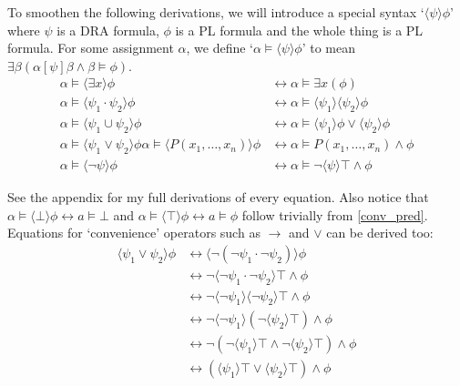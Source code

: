 \documentclass[12pt]{article}
\begin{document}
To smoothen the following derivations, we will introduce a special syntax `$\langle\psi\rangle\phi$' where $\psi$ is a DRA formula, $\phi$ is a PL formula and the whole thing is a PL formula. For some assignment $\alpha$, we define `$\alpha\models\langle\psi\rangle\phi$' to mean $\exists\beta(\alpha[\psi]\beta \wedge \beta\models\phi)$.
%
\begin{align}
\alpha\models\langle\exists x\rangle\phi
 & \leftrightarrow \alpha\models\exists x (\phi) \label{conv_exists}\\
\alpha\models\langle\psi_1\cdot\psi_2\rangle\phi
 & \leftrightarrow \alpha\models\langle\psi_1\rangle\langle\psi_2\rangle\phi \label{conv_and}\\
\alpha\models\langle\psi_1 \cup \psi_2\rangle\phi
 & \leftrightarrow \alpha\models\langle\psi_1\rangle\phi \vee \langle\psi_2\rangle\phi \label{conv_or}\\
 \alpha\models\langle\psi_1 \vee \psi_2\rangle\phi
\alpha\models\langle P(x_1,\dots,x_n)\rangle\phi
 & \leftrightarrow \alpha\models P(x_1,\dots,x_n) \wedge \phi \label{conv_pred}\\
\alpha\models\langle\neg\psi\rangle\phi
 & \leftrightarrow \alpha\models \neg\langle\psi\rangle\top \wedge \phi \label{conv_neg}
\end{align}

See the appendix for my full derivations of every equation. Also notice that $\alpha\models\langle\bot\rangle\phi\leftrightarrow a\models\bot$ and $\alpha\models\langle\top\rangle\phi\leftrightarrow a\models\phi$ follow trivially from \eqref{conv_pred}. Equations for `convenience' operators such as $\rightarrow$ and $\vee$ can be derived too:
\begin{align}
\langle\psi_1\vee\psi_2\rangle\phi
& \leftrightarrow \langle\neg(\neg\psi_1\cdot\neg\psi_2)\rangle\phi \nonumber\\
& \leftrightarrow \neg\langle\neg\psi_1\cdot\neg\psi_2\rangle\top \wedge\phi \nonumber\\
& \leftrightarrow \neg\langle\neg\psi_1\rangle\langle\neg\psi_2\rangle\top \wedge\phi \nonumber\\
& \leftrightarrow \neg\langle\neg\psi_1\rangle(\neg\langle\psi_2\rangle\top) \wedge\phi \nonumber\\
& \leftrightarrow \neg(\neg\langle\psi_1\rangle\top \wedge \neg\langle\psi_2\rangle\top) \wedge\phi \nonumber\\
& \leftrightarrow (\langle\psi_1\rangle\top \vee \langle\psi_2\rangle\top) \wedge\phi \label{conv_vee}
\end{align}
\end{document}
